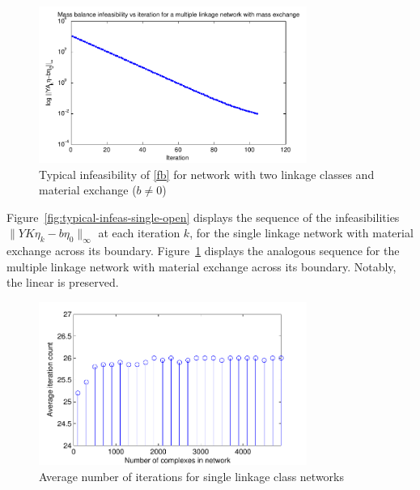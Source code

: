 \documentclass[smallextended]{svjour3}       %
\newcommand*{\0}{\mathbf{0}}
\newcommand*{\1}{\mathbf{1}}
\begin{document}
\begin{figure}%
   \centering
   \includegraphics[width=0.78\textwidth]{InfeasibilityVsIterationOpenMultiple}
   \caption{Typical infeasibility of \eqref{fb} for network with
            two linkage classes and material exchange ($b\neq0$)}
   \label{fig:typical-infeas-multiple-open}
\end{figure}

Figure~\ref{fig:typical-infeas-single-open} displays
the sequence of the infeasibilities $\|YK\eta_k-b\eta_0\|_\infty$ 
at each iteration $k$, for the single linkage network with material 
exchange across its boundary. Figure~\ref{fig:typical-infeas-multiple-open} 
displays the analogous sequence for the multiple linkage network with material
exchange across its boundary. Notably, the linear
is preserved.

\begin{figure}%
   \centering
   \includegraphics[width=0.78\textwidth]{SingleNetAvgIterationsVsNetSize} 
   \caption{Average number of iterations for single linkage class
            networks}
   \label{fig:iteration-count-simple} 
\end{figure}
\end{document}
